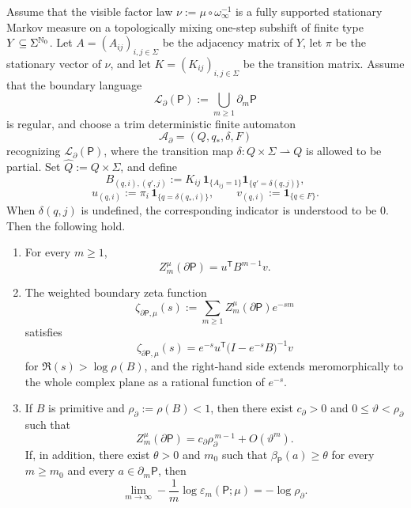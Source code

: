 \begin{theorem}
\label{thm:weighted-boundary-transfer}
Assume that the visible factor law
\(\nu:=\mu\circ\omega_\infty^{-1}\) is a fully supported stationary
Markov measure on a topologically mixing one-step subshift of finite
type \(Y\subseteq\Sigma^{\mathbb{N}_0}\).  Let \(A=(A_{ij})_{i,j\in\Sigma}\)
be the adjacency matrix of \(Y\), let \(\pi\) be the stationary vector
of \(\nu\), and let \(K=(K_{ij})_{i,j\in\Sigma}\) be the transition
matrix.  Assume that the boundary language
\[
  \mathcal{L}_\partial(\mathsf{P})
  := \bigcup_{m\geq 1}\partial_m\mathsf{P}
\]
is regular, and choose a trim deterministic finite automaton
\[
  \mathcal{A}_\partial=(Q,q_\ast,\delta,F)
\]
recognizing \(\mathcal{L}_\partial(\mathsf{P})\), where the transition
map \(\delta:Q\times\Sigma\rightharpoonup Q\) is allowed to be partial.
Set \(\widehat Q:=Q\times\Sigma\), and define
\[
  B_{(q,i),(q',j)}
  := K_{ij}\,
     \mathbf{1}_{\{A_{ij}=1\}}
     \mathbf{1}_{\{q'=\delta(q,j)\}},
\]
\[
  u_{(q,i)}:=\pi_i\,\mathbf{1}_{\{q=\delta(q_\ast,i)\}},
  \qquad
  v_{(q,i)}:=\mathbf{1}_{\{q\in F\}}.
\]
When \(\delta(q,j)\) is undefined, the corresponding indicator is
understood to be \(0\).
Then the following hold.
\begin{enumerate}[label=(\roman*)]
  \item For every \(m\geq 1\),
    \[
      Z_m^\mu(\partial\mathsf{P})=u^{\mathsf T}B^{m-1}v.
    \]
  \item The weighted boundary zeta function
    \[
      \zeta_{\partial\mathsf{P},\mu}(s)
      := \sum_{m\geq 1}
          Z_m^\mu(\partial\mathsf{P})e^{-sm}
    \]
    satisfies
    \[
      \zeta_{\partial\mathsf{P},\mu}(s)
      = e^{-s}u^{\mathsf T}
        \bigl(I-e^{-s}B\bigr)^{-1}v
    \]
    for \(\Re(s)>\log\rho(B)\), and the right-hand side extends
    meromorphically to the whole complex plane as a rational function of
    \(e^{-s}\).
  \item If \(B\) is primitive and \(\rho_\partial:=\rho(B)<1\), then
    there exist \(c_\partial>0\) and \(0\leq \vartheta<\rho_\partial\)
    such that
    \[
      Z_m^\mu(\partial\mathsf{P})
      = c_\partial\rho_\partial^{\,m-1}+O(\vartheta^m).
    \]
    If, in addition, there exist \(\theta>0\) and \(m_0\) such that
    \(\beta_{\mathsf{P}}(a)\geq \theta\) for every
    \(m\geq m_0\) and every \(a\in\partial_m\mathsf{P}\), then
    \[
      \lim_{m\to\infty}
      -\frac{1}{m}\log \varepsilon_m(\mathsf{P};\mu)
      = -\log\rho_\partial.
    \]
\end{enumerate}
\end{theorem}


